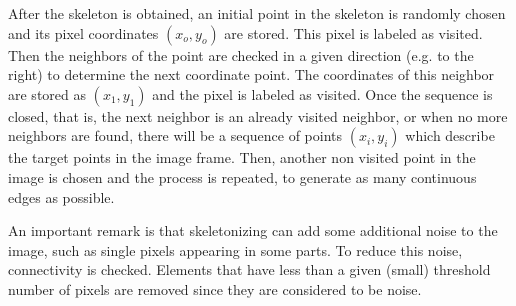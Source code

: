 \documentclass[conference]{IEEEtran}
\begin{document}
After the skeleton is obtained, an initial point in the skeleton is randomly chosen and its pixel coordinates $(x_o, y_o)$ are stored. This pixel is labeled as visited. Then the neighbors of the point are checked in a given direction (e.g. to the right) to determine the next coordinate point. The coordinates of this neighbor are stored as $(x_1,y_1)$ and the pixel is labeled as visited. Once the sequence is closed, that is, the next neighbor is an already visited neighbor, or when no more neighbors are found, there will be a sequence of points $(x_i,y_i)$ which describe the target points in the image frame. Then, another non visited point in the image is chosen and the process is repeated, to generate as many continuous edges as possible.

An important remark is that skeletonizing can add some additional noise to the image, such as single pixels appearing in some parts. To reduce this noise, connectivity is checked. Elements that have less than a given (small) threshold number of pixels are removed since they are considered to be noise.

\end{document}
